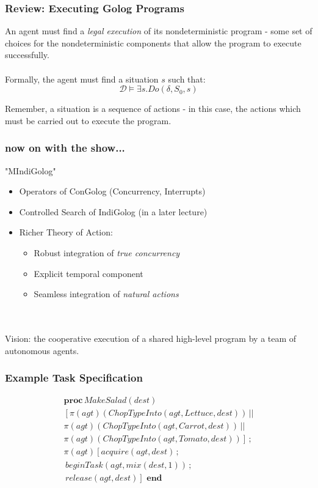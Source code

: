 \documentclass[compress]{beamer}
\begin{document}
\begin{frame}
\frametitle{Review: Executing Golog Programs}
An agent must find a \emph{legal execution} of its nondeterministic
program - some set of choices for the nondeterministic components that allow
the program to execute successfully.\\
\ \\
Formally, the agent must find a situation $s$ such that:\[
\mathcal{D} \models \exists s . Do(\delta,S_0,s)\]


Remember, a situation is a sequence of actions - in this case, the actions which must be carried out to execute the program.
\end{frame}


\begin{frame}
\frametitle{now on with the show...}
\centering "MIndiGolog"\\
\begin{itemize}
\item Operators of ConGolog (Concurrency, Interrupts)
\item Controlled Search of IndiGolog (in a later lecture)
\item Richer Theory of Action:
\begin{itemize}
\item Robust integration of \emph{true concurrency}
\item Explicit temporal component
\item Seamless integration of \emph{natural actions}
\end{itemize}
\end{itemize}
\ \\
\ \\
Vision: the cooperative execution of a shared high-level program by a team of autonomous agents.
\end{frame}

\begin{frame}
\frametitle{Example Task Specification}
\begin{multline*}
\mathbf{proc}\, MakeSalad(dest)\\
\left[\pi(agt)(ChopTypeInto(agt,Lettuce,dest))\,||\right.\\
\pi(agt)(ChopTypeInto(agt,Carrot,dest))\,||\\
\left.\pi(agt)(ChopTypeInto(agt,Tomato,dest))\right]\,;\\
\pi(agt)\left[acquire(agt,dest)\,;\right.\\
\,beginTask(agt,mix(dest,1))\,;\\
\left.\, release(agt,dest)\right]\,\,\mathbf{end}
\end{multline*}
\end{frame}
\end{document}
